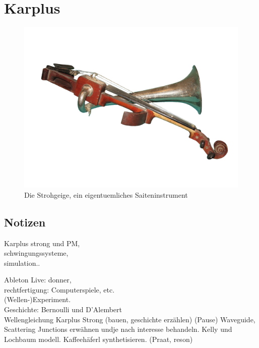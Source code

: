 \chapter{Karplus}
\label{Karplus}



\begin{figure}[h]
  \begin{center}
    \includegraphics[width = 14cm]{img/strohgeige.jpg}
    \caption{Die Strohgeige, ein eigentuemliches Saiteninstrument}
    \label{fig:metering}
  \end{center}
\end{figure}


\section{Notizen}



Karplus strong und PM,\\
schwingungssysteme,\\
simulation..

Ableton Live: donner,\\
rechtfertigung: Computerspiele, etc.\\
(Wellen-)Experiment.\\
Geschichte: Bernoulli und D'Alembert\\
Wellengleichung
Karplus Strong (bauen, geschichte erzählen)
(Pause)
Waveguide, Scattering Junctions erwähnen undje nach interesse behandeln. Kelly und Lochbaum modell.
Kaffeehäferl synthetisieren. (Praat, reson)




